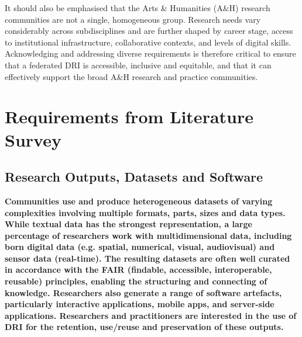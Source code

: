 \documentclass[11pt]{scrartcl}
\begin{document}
It should also be emphasised that the Arts \& Humanities (A\&H) research communities
are not a single, homogeneous group. Research needs vary considerably across
subdisciplines and are further shaped by career stage, access to institutional
infrastructure, collaborative contexts, and levels of digital skills.
Acknowledging and addressing diverse requirements is therefore critical to
ensure that a federated DRI is accessible, inclusive and equitable, and that it
can effectively support the broad A\&H research and practice communities.  

\section{Requirements from Literature Survey}
\subsection{Research Outputs, Datasets and Software}  
\textbf{Communities use and produce heterogeneous datasets of varying complexities involving multiple formats, parts, sizes and data types. While textual data has the strongest representation, a large percentage of researchers work with multidimensional data, including born digital data (e.g. spatial, numerical, visual, audiovisual) and sensor data (real-time). The resulting datasets are often well curated in accordance with the FAIR (findable, accessible, interoperable, reusable) principles, enabling the structuring and connecting of knowledge. Researchers also generate a range of software artefacts, particularly interactive applications, mobile apps, and server-side applications. Researchers and practitioners are interested in the use of DRI for the retention, use/reuse and preservation of these outputs.}
\end{document}
